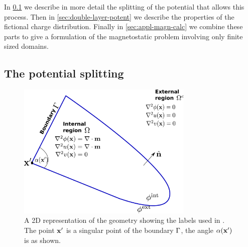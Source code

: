 In \cref{sec:problem-description} we describe in more detail the splitting of the potential that allows this process.
Then in \cref{sec:double-layer-potent} we describe the properties of the fictional charge distribution.
Finally in \cref{sec:appl-magn-calc} we combine these parts to give a formulation of the magnetostatic problem involving only finite sized domains.

\subsection{The potential splitting}
\label{sec:problem-description}
\newcommand{\examplepot}{f}

\begin{figure}
  \center
  \includegraphics[width=0.75\textwidth]{./images/BEM-geometry}




  \caption{A 2D representation of the geometry showing the labels used in .
    The point $\boldsymbol{\mathrm{x}}'$ is a singular point of the boundary ${\Gamma}$, the angle $\alpha(\boldsymbol{\mathrm{x}}')$ is as shown.}
  \label{fig:BEM-geometry}
\end{figure}

